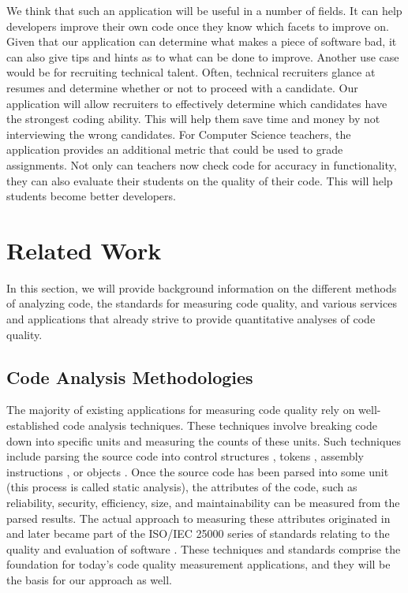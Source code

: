 \documentclass{sig-alternate}
\begin{document}
We think that such an application will be useful in a number of fields. It can help developers improve their own code once they know which facets to improve on. Given that our application can determine what makes a piece of software bad, it can also give tips and hints as to what can be done to improve. Another use case would be for recruiting technical talent. Often, technical recruiters glance at resumes and determine whether or not to proceed with a candidate. Our application will allow recruiters to effectively determine which candidates have the strongest coding ability. This will help them save time and money by not interviewing the wrong candidates. For Computer Science teachers, the application provides an additional metric that could be used to grade assignments. Not only can teachers now check code for accuracy in functionality, they can also evaluate their students on the quality of their code. This will help students become better developers.

\section{Related Work}
\label{sec:related_work}
In this section, we will provide background information on the different methods of analyzing code, the standards for measuring code quality, and various services and applications that already strive to provide quantitative analyses of code quality.

\subsection{Code Analysis Methodologies}
The majority of existing applications for measuring code quality rely on well-established code analysis techniques. These techniques involve breaking code down into specific units and measuring the counts of these units. Such techniques include parsing the source code into control structures \cite{mccabe1976complexity}, tokens \cite{halstead1977elements}, assembly instructions \cite{park1992software}, or objects \cite{chidamber1994metrics}. Once the source code has been parsed into some unit (this process is called static analysis), the attributes of the code, such as reliability, security, efficiency, size, and maintainability can be measured from the parsed results. The actual approach to measuring these attributes originated in \cite{boehm1976quantitative} and later became part of the ISO/IEC 25000 series of standards relating to the quality and evaluation of software \cite{iso2011iec}. These techniques and standards comprise the foundation for today's code quality measurement applications, and they will be the basis for our approach as well.
\end{document}
